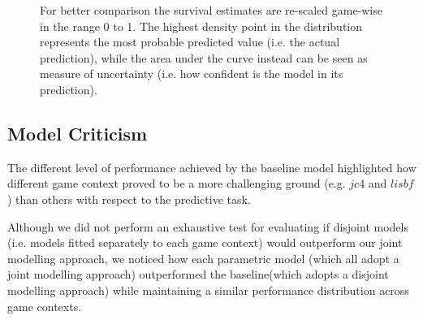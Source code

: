 \begin{figure}[h]
  \centering
  \hfill
  \caption[\textbf{Distribution of the BM predictions for six random users, one for each game}]{For better comparison the survival estimates are re-scaled game-wise in the range 0 to 1. The highest density point in the distribution represents the most probable predicted value (i.e. the actual prediction),  while the area under the curve instead can be seen as measure of uncertainty (i.e. how confident is the model in its prediction).}
  \label{distestimations}
\end{figure}



\subsection{Model Criticism}
\label{model_criticims_1}
The different level of performance achieved by the baseline model highlighted how different game context proved to be a more challenging ground (e.g. $jc4$ and $lisbf$) than others with respect to the predictive task. 

Although we did not perform an exhaustive test for evaluating if disjoint models (i.e. models fitted separately to each game context) would outperform our joint modelling approach, we noticed how each parametric model (which all adopt a joint modelling approach) outperformed the baseline(which adopts a disjoint modelling approach) while maintaining a similar performance distribution across game contexts. 

